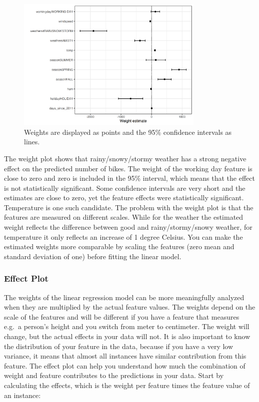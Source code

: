 \documentclass[
  11pt,
]{scrbook}
\begin{document}
\begin{figure}

{\centering \includegraphics[width=0.8\textwidth]{images/linear-weights-plot-1} 

}

\caption{Weights are displayed as points and the 95\% confidence intervals as lines.}\label{fig:linear-weights-plot}
\end{figure}

The weight plot shows that rainy/snowy/stormy weather has a strong negative effect on the predicted number of bikes.
The weight of the working day feature is close to zero and zero is included in the 95\% interval, which means that the effect is not statistically significant.
Some confidence intervals are very short and the estimates are close to zero, yet the feature effects were statistically significant.
Temperature is one such candidate.
The problem with the weight plot is that the features are measured on different scales.
While for the weather the estimated weight reflects the difference between good and rainy/stormy/snowy weather, for temperature it only reflects an increase of 1 degree Celsius.
You can make the estimated weights more comparable by scaling the features (zero mean and standard deviation of one) before fitting the linear model.

\hypertarget{effect-plot}{%
\subsubsection{Effect Plot}\label{effect-plot}}

The weights of the linear regression model can be more meaningfully analyzed when they are multiplied by the actual feature values.
The weights depend on the scale of the features and will be different if you have a feature that measures e.g.~a person's height and you switch from meter to centimeter.
The weight will change, but the actual effects in your data will not.
It is also important to know the distribution of your feature in the data, because if you have a very low variance, it means that almost all instances have similar contribution from this feature.
The effect plot can help you understand how much the combination of weight and feature contributes to the predictions in your data.
Start by calculating the effects, which is the weight per feature times the feature value of an instance:
\end{document}
